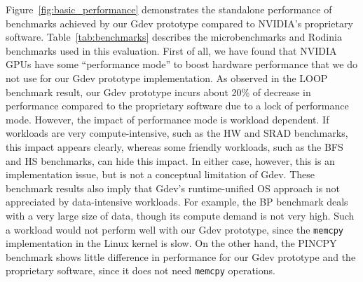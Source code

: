 Figure~\ref{fig:basic_performance} demonstrates the standalone
performance of benchmarks achieved by our Gdev prototype compared to
NVIDIA's proprietary software.
Table~\ref{tab:benchmarks} describes the microbenchmarks and
Rodinia~\cite{Che_IISWC09} benchmarks used in this evaluation.
First of all, we have found that NVIDIA GPUs have some ``performance
mode'' to boost hardware performance that we do not use for our Gdev
prototype implementation.
As observed in the LOOP benchmark result, our Gdev prototype incurs
about 20\% of decrease in performance compared to the proprietary
software due to a lock of performance mode.
However, the impact of performance mode is workload dependent.
If workloads are very compute-intensive, such as the HW and SRAD
benchmarks, this impact appears clearly, whereas some friendly workloads,
such as the BFS and HS benchmarks, can hide this impact.
In either case, however, this is an implementation issue, but is
not a conceptual limitation of Gdev.
These benchmark results also imply that Gdev's runtime-unified OS approach
is not appreciated by data-intensive workloads.
For example, the BP benchmark deals with a very large size of data,
though its compute demand is not very high.
Such a workload would not perform well with our Gdev prototype, since
the \texttt{memcpy} implementation in the Linux kernel is slow.
On the other hand, the PINCPY benchmark shows little difference in
performance for our Gdev prototype and the proprietary software, since
it does not need \texttt{memcpy} operations.

